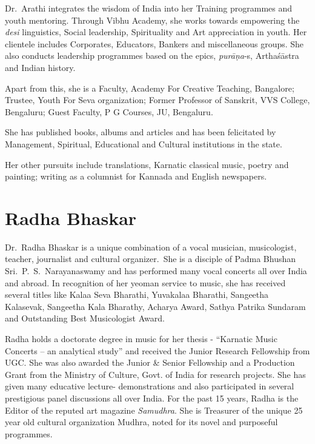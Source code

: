 Dr.~Arathi integrates the wisdom of India into her Training progra\-mmes and youth mentoring. Through Vibhu Academy, she works towards empowering the \textit{desi} linguistics, Social leadership, Spirituality and Art appreciation in youth. Her clientele includes Corporates, Educators, Bankers and miscellaneous groups. She also conducts leadership programmes based on the epics, \textit{purāṇa}-s, Arthaśāstra and Indian history.

Apart from this, she is a Faculty, Academy For Creative Teaching, Bangalore; Trustee, Youth For Seva organization; Former Professor of Sanskrit, VVS College, Bengaluru; Guest Faculty, P G Courses, JU, Bengaluru.

She has published books, albums and articles and has been felicitated by Management, Spiritual, Educational and Cultural institutions in the state.

Her other pursuits include translations, Karnatic classical music, poetry and painting; writing as a columnist for Kannada and English newspapers.

\vspace{-.5cm}

\section*{Radha Bhaskar}

\vspace{-.2cm}

Dr.~Radha Bhaskar is a unique combination of a vocal musician, musicologist, teacher, journalist and cultural organizer.~She is a disciple of Padma Bhushan Sri.~P.~S.~Narayanaswamy and has performed many vocal concerts all over India and abroad. In recognition of her yeoman service to music, she has received several titles like Kalaa Seva Bharathi, Yuvakalaa Bharathi, Sangeetha Kalasevak, Sangeetha Kala Bharathy, Acharya Award, Sathya Patrika Sundaram and Outstanding Best Musicologist Award.

Radha holds a doctorate degree in music for her thesis - “Karnatic Music Concerts – an analytical study” and received the Junior Research Fellowship from UGC. She was also awarded the Junior \& Senior Fellowship and a Production Grant from the Ministry of Culture, Govt. of India for research projects. She has given many educative lecture- demonstrations and also participated in several prestigious panel discussions all over India. For the past 15 years, Radha is the Editor of the reputed art magazine \textit{Samudhra}. She is Treasurer of the unique 25 year old cultural organization Mudhra, noted for its novel and purposeful programmes.

